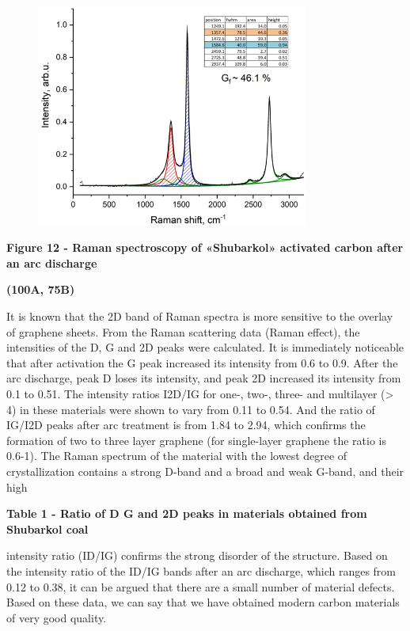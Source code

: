 \begin{figure}[H]
	\centering
	\includegraphics[width=0.8\textwidth]{assets/64}
	\caption*{}
\end{figure}

{\bfseries Figure 12 - Raman spectroscopy of «Shubarkol» activated carbon
after an arc discharge}

{\bfseries (100A, 75B)}

It is known that the 2D band of Raman spectra is more sensitive to the
overlay of graphene sheets. From the Raman scattering data (Raman
effect), the intensities of the D, G and 2D peaks were calculated. It is
immediately noticeable that after activation the G peak increased its
intensity from 0.6 to 0.9. After the arc discharge, peak D loses its
intensity, and peak 2D increased its intensity from 0.1 to 0.51. The
intensity ratios I2D/IG for one-, two-, three- and multilayer
(\textgreater{} 4) in these materials were shown to vary from 0.11 to
0.54. And the ratio of IG/I2D peaks after arc treatment is from 1.84 to
2.94, which confirms the formation of two to three layer graphene (for
single-layer graphene the ratio is 0.6-1). The Raman spectrum of the
material with the lowest degree of crystallization contains a strong
D-band and a broad and weak G-band, and their high

{\bfseries Table 1 - Ratio of D G and 2D peaks in materials obtained from
Shubarkol coal}

intensity ratio (ID/IG) confirms the strong disorder of the structure.
Based on the intensity ratio of the ID/IG bands after an arc discharge,
which ranges from 0.12 to 0.38, it can be argued that there are a small
number of material defects. Based on these data, we can say that we have
obtained modern carbon materials of very good quality.

